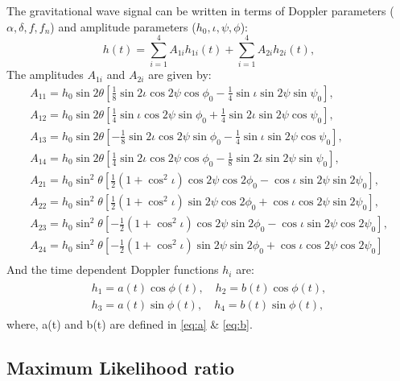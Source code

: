 \documentclass{ttuthes2007}
\begin{document}
The gravitational wave signal can be written in terms of Doppler
parameters ($\alpha, \delta, f, f_n $) and amplitude parameters ($h_0, \iota, \psi,
\phi$):
\begin{equation}
h(t) = \sum_{i=1}^{4}A_{1i} h_{1i}(t) + \sum_{i=1}^{4} A_{2i} h_{2i}(t),
\end{equation}
The amplitudes $A_{1i}$ and $A_{2i}$ are given by:
\begin{align*}
A_{11} = h_0 \sin{2\theta}\left[\frac{1}{8} \sin{2\iota}\cos{2\psi}\cos{\phi_0}-
\frac{1}{4}\sin{\iota} \sin{2\psi}\sin{\psi_0}\right], \\
A_{12} = h_0 \sin{2\theta}\left[\frac{1}{4} \sin{\iota}\cos{2\psi}\sin{\phi_0}+
\frac{1}{4}\sin{2\iota} \sin{2\psi}\cos{\psi_0}\right], \\
A_{13} = h_0 \sin{2\theta}\left[-\frac{1}{8} \sin{2\iota}\cos{2\psi}\sin{\phi_0}
-\frac{1}{4}\sin{\iota} \sin{2\psi}\cos{\psi_0}\right], \\
A_{14} = h_0 \sin{2\theta}\left[\frac{1}{4} \sin{2\iota}\cos{2\psi}\cos{\phi_0}-
\frac{1}{8}\sin{2\iota} \sin{2\psi}\sin{\psi_0}\right], \\
A_{21} = h_0 \sin^2{\theta}\left[\frac{1}{2}
(1+\cos^2{\iota})\cos{2\psi}\cos{2\phi_0}- \cos{\iota} \sin{2\psi}\sin{2\psi_0}\right], \\
A_{22} = h_0 \sin^2{\theta}\left[\frac{1}{2}
(1+\cos^2{\iota})\sin{2\psi}\cos{2\phi_0} + \cos{\iota} \cos{2\psi}\sin{2\psi_0}\right], \\
A_{23} = h_0 \sin^2{\theta}\left[-\frac{1}{2}
(1+\cos^2{\iota})\cos{2\psi}\sin{2\phi_0}- \cos{\iota} \sin{2\psi}\cos{2\psi_0}\right], \\
A_{24} = h_0 \sin^2{\theta}\left[-\frac{1}{2}
(1+\cos^2{\iota})\sin{2\psi}\sin{2\phi_0} + \cos{\iota} \cos{2\psi}\cos{2\psi_0}\right]\\
\end{align*}
And the time dependent Doppler functions $h_{i}$ are:
\begin{align}
\begin{split}\label{h}
h_{1}=a(t) \cos{\phi(t)},\quad h_{2}=b(t) \cos{\phi(t)},\\ 
h_{3}=a(t) \sin{\phi(t)},\quad h_{4}=b(t) \sin{\phi(t)}, 
\end{split}
\end{align}
where, a(t) and b(t) are defined in \ref{eq:a} \& \ref{eq:b}.



\subsection{Maximum Likelihood ratio}
\end{document}
